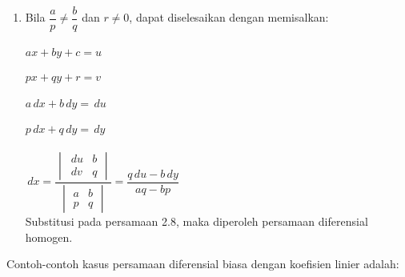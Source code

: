 \begin{enumerate}[1.]
	\item Bila \begin{math} \dfrac{a}{p} \neq \dfrac{b}{q} \end{math}  dan \begin{math} r \neq 0 \end{math}, dapat diselesaikan dengan memisalkan:
                   \\ \\
	        \begin{math} ax + by + c = u \end{math} \\ \\
                   \begin{math} px + qy + r = v \end{math} \\ \\
                   \begin{math} a \,dx + b \, dy = \, du \end{math} \\ \\
                   \begin{math} p \,dx + q \, dy = \, dy \end{math} \\ \\
        	        \begin{math} \, dx = \dfrac{
 		 \begin{vmatrix}
    			\, du & b \\
   			\, dv & q
		\end{vmatrix}
		}
  		 {
   		\begin{vmatrix}
    			a & b \\
   			p & q
   		\end{vmatrix}
   			 } = \dfrac{q \, du - b \, dy}{aq - bp}
	        \end{math} \\

Substitusi pada persamaan 2.8, maka diperoleh persamaan diferensial homogen.

\end{enumerate}

Contoh-contoh kasus persamaan diferensial biasa dengan koefisien linier adalah:

